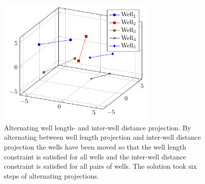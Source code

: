 \begin{figure}[H]
	\centering
	\includegraphics[width=0.70\textwidth]{figures/both_projections/both_projections.pdf}
	\caption{Alternating well length- and inter-well distance projection. By alternating between
											well length projection and inter-well distance projection
											the wells have been moved so that the well length constraint
											is satisfied for all wells and the inter-well distance constraint
											is satisfied for all pairs of wells. The solution took six 
											steps of alternating projections.}
	\label{fig:initial_5_both}
\end{figure}
%
%
